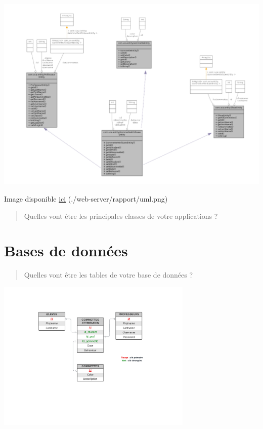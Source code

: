 \documentclass[11pt]{article}
\begin{document}
\begin{center}
\includegraphics[width=.9\linewidth]{./uml.png}
\end{center}

Image disponible \href{./uml.png}{ici} (./web-server/rapport/uml.png)

\begin{quote}
Quelles vont être les principales classes de votre applications ?
\end{quote}

\section{Bases de données}
\label{sec:org7afbb43}

\begin{quote}
Quelles vont être les tables de votre base de données ?
\end{quote}

\begin{center}
\includegraphics[width=0.7\textwidth]{./uml-bdd.png}
\end{center}
\end{document}
